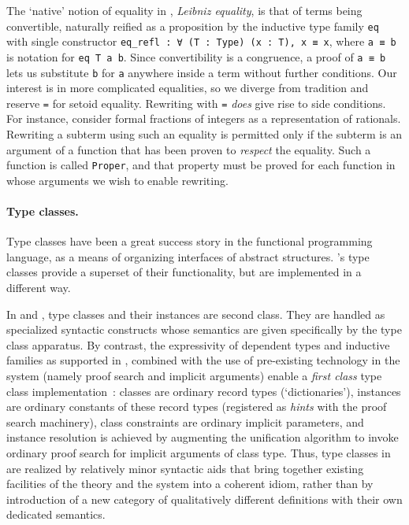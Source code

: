 \documentclass[a4paper,10pt,runningheads]{llncs}
\begin{document}
The `native' notion of equality in \Coq{}, \emph{Leibniz equality}, is that of terms being convertible, naturally reified as a proposition by the inductive type family \lstinline|eq| with single constructor \lstinline|eq_refl : ∀ (T : Type) (x : T), x ≡ x|, where \lstinline|a ≡ b| is notation for \mbox{\lstinline|eq T a b|}. Since convertibility is a congruence, a proof of \lstinline|a ≡ b| lets us substitute \lstinline|b| for \lstinline|a| anywhere inside a term without further conditions. Our interest is in more complicated equalities, so we diverge from \Coq{} tradition and reserve \lstinline|=| for setoid equality.
Rewriting with \lstinline|=| \emph{does} give rise to side conditions. For instance, consider formal fractions of integers as a representation of rationals. Rewriting a subterm using such an equality is permitted only if the subterm is an argument of a function that has been proven to \emph{respect} the equality. Such a function is called \lstinline|Proper|, and that property must be proved for each function in whose arguments we wish to enable rewriting.

\paragraph{Type classes.}
Type classes have been a great success story in the \Haskell{} functional programming language, as a means of organizing interfaces of abstract structures. \Coq's type classes provide a superset of their functionality, but are implemented in a different way.

In \Haskell{} and \Isabelle, type classes and their instances are second class. They are handled as specialized syntactic constructs whose semantics are given specifically by the type class apparatus. By contrast, the expressivity of dependent types and inductive families as supported in \Coq, combined with the use of pre-existing technology in the system (namely proof search and implicit arguments) enable a \emph{first class} type class implementation~\cite{DBLP:conf/tphol/SozeauO08}: classes are ordinary record types (`dictionaries'), instances are ordinary constants of these record types (registered as \emph{hints} with the proof search machinery), class constraints are ordinary implicit parameters, and instance resolution is achieved by augmenting the unification algorithm to invoke ordinary proof search for implicit arguments of class type.
Thus, type classes in \Coq{} are realized by relatively minor syntactic aids that bring together existing facilities of the theory and the system into a coherent idiom, rather than by introduction of a new category of qualitatively different definitions with their own dedicated semantics.
\end{document}

